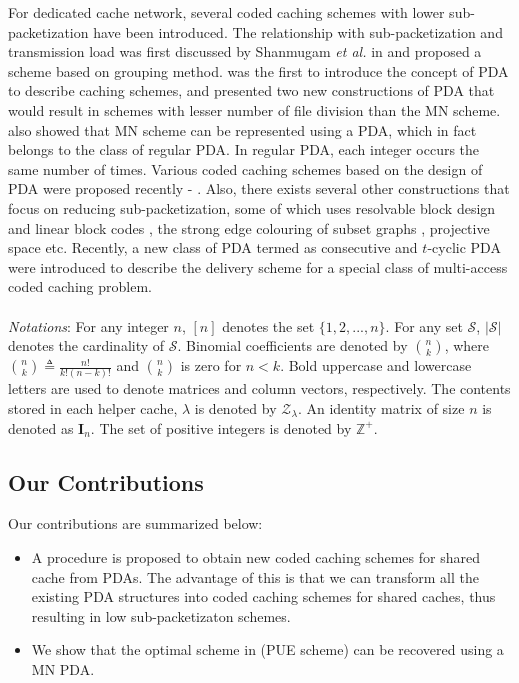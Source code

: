 \documentclass[conference,a4paper,10pt]{IEEEtran}
\begin{document}
For dedicated cache network, several coded caching schemes with lower sub-packetization have been introduced. The relationship with sub-packetization and transmission load was first discussed by Shanmugam \textit{et al.} in \cite{SJTLD} and proposed a scheme based on grouping method. \cite{YCT} was the first to introduce the concept of PDA to describe caching schemes, and presented two new constructions of PDA that would result in schemes with lesser number of file division than the MN scheme. \cite{YCT} also showed that MN scheme can be represented using a PDA, which in fact belongs to the class of regular PDA. In regular PDA, each integer occurs the same number of times. Various coded caching schemes based on the design of PDA were proposed recently \cite{PDA1} - \cite{PDA6}. Also, there exists several other constructions that focus on reducing sub-packetization, some of which uses resolvable block design and linear block codes \cite{TaR}, the strong edge colouring of subset graphs \cite{YTCC}, projective space \cite{Pkrishnan} etc. Recently, a new class of PDA termed as consecutive and $t$-cyclic PDA were introduced \cite{SaR} to describe the delivery scheme for a special class of multi-access coded caching problem.
\\
\\
\noindent \textit{Notations}: For any integer $n$, $[n]$ denotes the set $\{1,2,...,n\}$. For any set $\mathcal{S}$, $|\mathcal{S}|$ denotes the cardinality of $\mathcal{S}$. Binomial coefficients are denoted by $\binom{n}{k}$, where $\binom{n}{k} \triangleq \frac{n!}{k!(n-k)!}$ and $\binom{n}{k}$ is zero for $n < k$.
Bold uppercase and lowercase letters are used to denote matrices and column vectors, respectively. The contents stored in each helper cache, $\lambda$ is denoted by $\mathcal{Z}_{\lambda}$. An identity matrix of size $n$ is denoted as $\mathbf{I}_{n}$. The set of positive integers is denoted by $\mathbb{Z}^{+}$. 

\subsection{Our Contributions}
Our contributions are summarized below:
\begin{itemize}
	\item A procedure is proposed to obtain new coded caching schemes for shared cache from PDAs. The advantage of this is that we can transform all the existing PDA structures into coded caching schemes for shared caches, thus resulting in low sub-packetizaton schemes.
	
	\item We show that the optimal scheme in \cite{PUE} (PUE scheme) can be recovered using a MN PDA.
\end{itemize}
\end{document}
